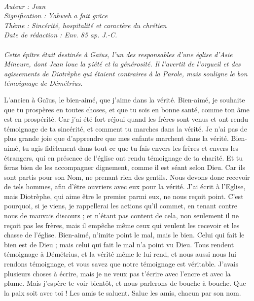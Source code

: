 \BFont
\noindent\hrulefill
{\footnotesize
\textit{
\bigskip
{\centering{}
\\Auteur : Jean
\\Signification : Yahweh a fait grâce
\\Thème : Sincérité, hospitalité et caractère du chrétien
\\Date de rédaction : Env. 85 ap. J.-C.\\}
}
\textit{
\\Cette épître était destinée à Gaïus, l’un des responsables d’une église d’Asie Mineure, dont Jean loue la piété et la générosité. Il l’avertit de l’orgueil et des agissements de Diotrèphe qui étaient contraires à la Parole, mais souligne le bon témoignage de Démétrius.\bigskip
}
}
\par\nobreak\noindent\hrulefill
\begin{multicols}{2}
\VerseOne{}L'ancien à Gaïus, le bien-aimé, que j'aime dans la vérité.
Bien-aimé, je souhaite que tu prospères en toutes choses, et que tu sois en bonne santé, comme ton âme est en prospérité.
Car j’ai été fort réjoui quand les frères sont venus et ont rendu témoignage de ta sincérité, et comment tu marches dans la vérité.
Je n'ai pas de plus grande joie que d’apprendre que mes enfants marchent dans la vérité.
Bien-aimé, tu agis fidèlement dans tout ce que tu fais envers les frères et envers les étrangers,
qui en présence de l'église ont rendu témoignage de ta charité. Et tu feras bien de les accompagner dignement, comme il est séant selon Dieu.
Car ils sont partis pour son Nom, ne prenant rien des gentils.
Nous devons donc recevoir de tels hommes, afin d’être ouvriers avec eux pour la vérité.
J'ai écrit à l'Eglise, mais Diotrèphe, qui aime être le premier parmi eux, ne nous reçoit point.
C'est pourquoi, si je viens, je rappellerai les actions qu'il commet, en tenant contre nous de mauvais discours ; et n'étant pas content de cela, non seulement il ne reçoit pas les frères, mais il empêche même ceux qui veulent les recevoir et les chasse de l'église.
Bien-aimé, n'imite point le mal, mais le bien. Celui qui fait le bien est de Dieu ; mais celui qui fait le mal n'a point vu Dieu.
Tous rendent témoignage à Démétrius, et la vérité même le lui rend, et nous aussi nous lui rendons témoignage, et vous savez que notre témoignage est véritable.
J'avais plusieurs choses à écrire, mais je ne veux pas t'écrire avec l'encre et avec la plume.
Mais j'espère te voir bientôt, et nous parlerons de bouche à bouche.
Que la paix soit avec toi ! Les amis te saluent. Salue les amis, chacun par son nom.
\PPE{}
\end{multicols}
